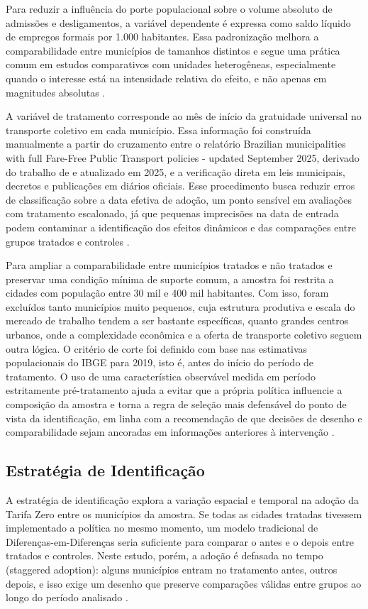 \documentclass[12pt, a4paper]{article}
\begin{document}
Para reduzir a influência do porte populacional sobre o volume absoluto de admissões e desligamentos, a variável dependente é expressa como saldo líquido de empregos formais por 1.000 habitantes.
Essa padronização melhora a comparabilidade entre municípios de tamanhos distintos e segue uma prática comum em estudos comparativos com unidades heterogêneas, especialmente quando o interesse está na intensidade relativa do efeito, e não apenas em magnitudes absolutas \citep{imbens2004, FredrikssonOliveira2019}.

A variável de tratamento corresponde ao mês de início da gratuidade universal no transporte coletivo em cada município.
Essa informação foi construída manualmente a partir do cruzamento entre o relatório Brazilian municipalities with full Fare-Free Public Transport policies - updated September 2025, derivado do trabalho de \citet{santini2024} e atualizado em 2025, e a verificação direta em leis municipais, decretos e publicações em diários oficiais.
Esse procedimento busca reduzir erros de classificação sobre a data efetiva de adoção, um ponto sensível em avaliações com tratamento escalonado, já que pequenas imprecisões na data de entrada podem contaminar a identificação dos efeitos dinâmicos e das comparações entre grupos tratados e controles \citep{CallawaySantanna2021, rothsantannabilinskipoe2023}.

Para ampliar a comparabilidade entre municípios tratados e não tratados e preservar uma condição mínima de suporte comum, a amostra foi restrita a cidades com população entre 30 mil e 400 mil habitantes.
Com isso, foram excluídos tanto municípios muito pequenos, cuja estrutura produtiva e escala do mercado de trabalho tendem a ser bastante específicas, quanto grandes centros urbanos, onde a complexidade econômica e a oferta de transporte coletivo seguem outra lógica.
O critério de corte foi definido com base nas estimativas populacionais do IBGE para 2019, isto é, antes do início do período de tratamento.
O uso de uma característica observável medida em período estritamente pré-tratamento ajuda a evitar que a própria política influencie a composição da amostra e torna a regra de seleção mais defensável do ponto de vista da identificação, em linha com a recomendação de que decisões de desenho e comparabilidade sejam ancoradas em informações anteriores à intervenção \citep{imbens2004, FredrikssonOliveira2019, BakerCallawayCunninghamGoodmanSantanna2025}.

\subsection{Estratégia de Identificação}
A estratégia de identificação explora a variação espacial e temporal na adoção da Tarifa Zero entre os municípios da amostra.
Se todas as cidades tratadas tivessem implementado a política no mesmo momento, um modelo tradicional de Diferenças-em-Diferenças seria suficiente para comparar o antes e o depois entre tratados e controles.
Neste estudo, porém, a adoção é defasada no tempo (staggered adoption): alguns municípios entram no tratamento antes, outros depois, e isso exige um desenho que preserve comparações válidas entre grupos ao longo do período analisado \citep{CallawaySantanna2021, BakerCallawayCunninghamGoodmanSantanna2025}.
\end{document}
